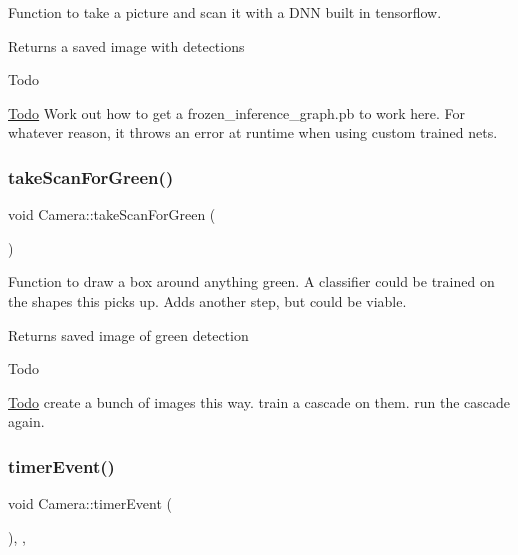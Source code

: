 Function to take a picture and scan it with a D\+NN built in tensorflow.

\begin{DoxyReturn}{Returns}
a saved image with detections
\end{DoxyReturn}
\begin{DoxyRefDesc}{Todo}
\item[\hyperlink{todo__todo000004}{Todo}]Work out how to get a frozen\+\_\+inference\+\_\+graph.\+pb to work here. For whatever reason, it throws an error at runtime when using custom trained nets. \end{DoxyRefDesc}
\mbox{\label{classCamera_ab4f4c3f77479c8594dfa7fd7e6348306}} 
\subsubsection{\texorpdfstring{take\+Scan\+For\+Green()}{takeScanForGreen()}}
{\footnotesize\ttfamily void Camera\+::take\+Scan\+For\+Green (\begin{DoxyParamCaption}{ }\end{DoxyParamCaption})}

Function to draw a box around anything green. A classifier could be trained on the shapes this picks up. Adds another step, but could be viable.

\begin{DoxyReturn}{Returns}
saved image of green detection
\end{DoxyReturn}
\begin{DoxyRefDesc}{Todo}
\item[\hyperlink{todo__todo000006}{Todo}]create a bunch of images this way. train a cascade on them. run the cascade again. \end{DoxyRefDesc}
\mbox{\label{classCamera_afcf6ca7256cd36f2f4a5ba088d67090a}} 
\subsubsection{\texorpdfstring{timer\+Event()}{timerEvent()}}
{\footnotesize\ttfamily void Camera\+::timer\+Event (\begin{DoxyParamCaption}{ }\end{DoxyParamCaption})\hspace{0.3cm}{\ttfamily [inline]}, {\ttfamily [private]}, {\ttfamily [virtual]}}

